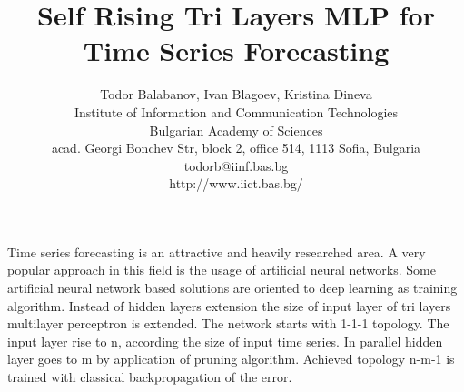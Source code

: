 \documentclass[12pt,a4paper]{article}
\title{\bf Self Rising Tri Layers MLP for Time Series Forecasting}
\author{Todor Balabanov, Ivan Blagoev, Kristina Dineva \\
Institute of Information and Communication Technologies \\
Bulgarian Academy of Sciences \\
acad. Georgi Bonchev Str, block 2, office 514, 1113 Sofia, Bulgaria \\
todorb@iinf.bas.bg \\
http://www.iict.bas.bg/}
\date{}
\begin{document}
\maketitle

Time series forecasting is an attractive and heavily researched area. A very popular approach in this field is the usage of artificial neural networks. Some artificial neural network based solutions are oriented to deep learning as training algorithm. Instead of hidden layers extension the size of input layer of tri layers multilayer perceptron is extended. The network starts with 1-1-1 topology. The input layer rise to n, according the size of input time series. In parallel hidden layer goes to m by application of pruning algorithm. Achieved topology n-m-1 is trained with classical backpropagation of the error.
\end{document}
